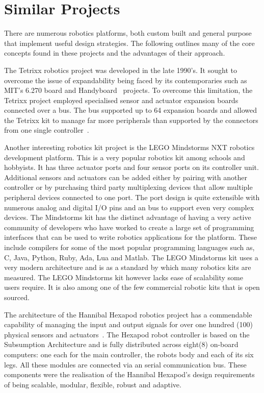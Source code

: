 \section{Similar Projects} %
\label{sec:similar}

There are numerous robotics platforms, both custom built and general purpose that implement useful design strategies. The following outlines many of the core concepts found in these projects and the advantages of their approach.

The Tetrixx robotics project was developed in the late 1990's. It sought to overcome the issue of expandability being faced by its contemporaries such as MIT's 6.270 board and Handyboard~\parencite{handy} projects. To overcome this limitation, the Tetrixx project employed specialised sensor and actuator expansion boards connected over a bus. The bus supported up to 64 expansion boards and allowed the Tetrixx kit to manage far more peripherals than supported by the connectors from one single controller~\parencite{tetrixx}.

Another interesting robotics kit project is the LEGO Mindstorms NXT robotics development platform. This is a very popular robotics kit among schools and hobbyists. It has three actuator ports and four sensor ports on its controller unit. Additional sensors and actuators can be added either by pairing with another controller or by purchasing third party multiplexing devices that allow multiple peripheral devices connected to one port. The port design is quite extensible with numerous analog and digital I/O pins and an \iic bus to support even very complex devices. The Mindstorms kit has the distinct advantage of having a very active community of developers who have worked to create a large set of programming interfaces that can be used to write robotics applications for the platform. These include compilers for some of the most popular programming languages such as, C, Java, Python, Ruby, Ada, Lua and Matlab. The LEGO Mindstorms kit uses a very modern architecture and is as a standard by which many robotics kits are measured. The LEGO Mindstorms kit however lacks ease of scalability some users require. It is also among one of the few commercial robotic kits that is open sourced. 

The architecture of the Hannibal Hexapod robotics project has a commendable capability of managing the input and output signals for over one hundred (100) physical sensors and actuators~\parencite{hannibal}. The Hexapod robot controller is based on the Subsumption Architecture and is fully distributed across eight(8) on-board computers: one each for the main controller, the robots body and each of its six legs. All these modules are connected via an \iic serial communication bus. These components were the realisation of the Hannibal Hexapod's design requirements of being scalable, modular, flexible, robust and adaptive.

